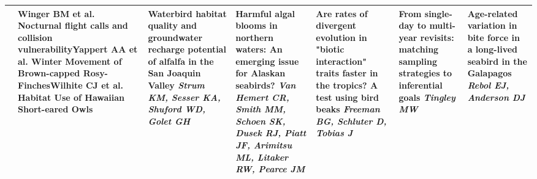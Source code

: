 \begin{tabular}{|x{0.75cm}|x{2.25cm}|a{2.25cm}|a{2.25cm}|a{2.25cm}|a{2.25cm}|x{2.25cm}|}
&\scriptsize Winger BM et al. \newline \tiny Nocturnal flight calls and collision vulnerability\newline \newline \scriptsize Yappert AA et al. \newline \tiny Winter Movement of Brown-capped Rosy-Finches\newline \newline \scriptsize Wilhite CJ et al. \newline \tiny Habitat Use of Hawaiian Short-eared Owls & Waterbird habitat quality and groundwater recharge potential of alfalfa in the San Joaquin Valley \newline \newline \textit{Strum KM, Sesser KA, Shuford WD, Golet GH} & Harmful algal blooms in northern waters: An emerging issue for Alaskan seabirds? \newline \newline \textit{Van Hemert CR, Smith MM, Schoen SK, Dusek RJ, Piatt JF, Arimitsu ML, Litaker RW, Pearce JM} & Are rates of divergent evolution in "biotic interaction" traits faster in the tropics? A test using bird beaks \newline \newline \textit{Freeman BG, Schluter D, Tobias J} & From single-day to multi-year revisits: matching sampling strategies to inferential goals \newline \newline \textit{Tingley MW} & Age-related variation in bite force in a long-lived seabird in the Galapagos \newline \newline \textit{Rebol EJ, Anderson DJ}\\
\hline

\end{tabular}
